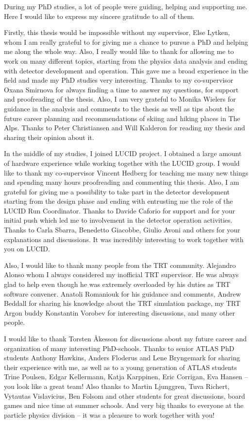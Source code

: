 \begin{acknowledgements}
  
During my PhD studies, a lot of people were guiding, helping and supporting me. Here I would like to express my sincere gratitude to all of them.

Firstly, this thesis would be impossible without my supervisor, Else Lytken, whom I am really grateful to for giving me a chance to pursue a PhD and helping me along the whole way. Also, I really would like to thank for allowing me to work on many different topics, starting from the physics data analysis and ending with detector development and operation. This gave me a broad experience in the field and made my PhD studies very interesting.
Thanks to my co-supervisor Oxana Smirnova for always finding a time to answer my questions, for support and proofreading of the thesis.
Also, I am very grateful to Monika Wielers for guidance in the analysis and comments to the thesis as well as tips about the future career planning and recommendations of skiing and hiking places in The Alps.  
Thanks to Peter Christiansen and Will Kalderon for reading my thesis and sharing their opinion about it. 

In the middle of my studies, I joined LUCID project. I obtained a large amount of hardware experience while working together with the LUCID group.
I would like to thank my co-supervisor Vincent Hedberg for teaching me many new things and spending many hours proofreading and commenting this thesis. Also, I am grateful for giving me a possibility to take part in the detector development starting from the design phase and ending with entrusting me the role of the LUCID Run Coordinator. Thanks to Davide Caforio for support and for your initial push which led me to involvement in the detector operation activities. Thanks to Carla Sbarra, Benedetto Giacobbe, Giulio Avoni and others for your explanations and discussions. It was incredibly interesting to work together with you on LUCID.

Also, I would like to thank many people from the TRT community. Alejandro Alonso whom I always considered my inofficial TRT supervisor. He was always glad to help even though he was extremely overloaded by his duties as TRT software convener. 
Anatoli Romaniouk for his guidance and comments,
Andrew Beddall for sharing his knowledge about the TRT simulation package, my TRT Argon buddy Konstantin Vorobev for interesting discussions, and many other people. 

I would like to thank Torsten \AA{}kesson for discussions about my future career and organization of many interesting PhD-schools.
Thanks to senior ATLAS PhD students Anthony Hawkins, Anders Floderus and Lene Bryngemark for sharing their experience with me, as well as to a young generation of ATLAS students Trine Poulsen, Edgar Kellermann, Katja Karppinen, Eric Corrigan, Eva Hansen -- you look like a great team!
Also thanks to Martin Ljunggren, Tuva Richert, Vytautas Vislavicius, Ben Folsom and other students for great discussions, board games and nice time at summer schools.
And very big thanks to everyone at the particle physics division -- it was a pleasure to work together with you!


\end{acknowledgements}
